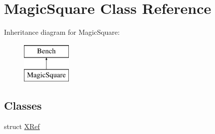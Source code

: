 \hypertarget{classMagicSquare}{\section{\-Magic\-Square \-Class \-Reference}
\label{classMagicSquare}
}
\-Inheritance diagram for \-Magic\-Square\-:\begin{figure}[H]
\begin{center}
\leavevmode
\includegraphics[height=2.000000cm]{classMagicSquare}
\end{center}
\end{figure}
\subsection*{\-Classes}
\begin{DoxyCompactItemize}
\item 
struct \hyperlink{structMagicSquare_1_1XRef}{\-X\-Ref}
\end{DoxyCompactItemize}
